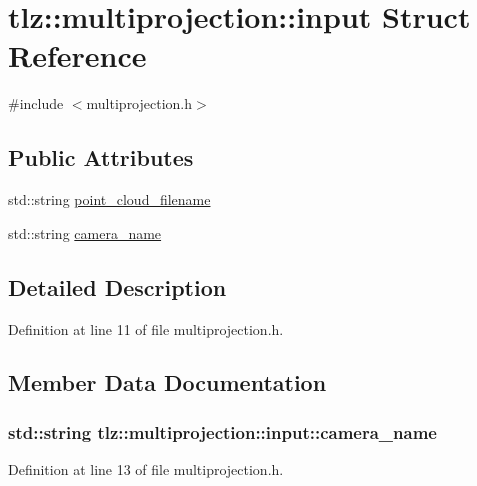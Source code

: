 \hypertarget{structtlz_1_1multiprojection_1_1input}{}\section{tlz\+:\+:multiprojection\+:\+:input Struct Reference}
\label{structtlz_1_1multiprojection_1_1input}


{\ttfamily \#include $<$multiprojection.\+h$>$}

\subsection*{Public Attributes}
\begin{DoxyCompactItemize}
\item 
std\+::string \hyperlink{structtlz_1_1multiprojection_1_1input_a1dfef32ce2e5ba23297696e305178c58}{point\+\_\+cloud\+\_\+filename}
\item 
std\+::string \hyperlink{structtlz_1_1multiprojection_1_1input_a6597b508cdca1e14a6554fc4eeffe8b6}{camera\+\_\+name}
\end{DoxyCompactItemize}


\subsection{Detailed Description}


Definition at line 11 of file multiprojection.\+h.



\subsection{Member Data Documentation}
\subsubsection[{\texorpdfstring{camera\+\_\+name}{camera_name}}]{\setlength{\rightskip}{0pt plus 5cm}std\+::string tlz\+::multiprojection\+::input\+::camera\+\_\+name}\hypertarget{structtlz_1_1multiprojection_1_1input_a6597b508cdca1e14a6554fc4eeffe8b6}{}\label{structtlz_1_1multiprojection_1_1input_a6597b508cdca1e14a6554fc4eeffe8b6}


Definition at line 13 of file multiprojection.\+h.

